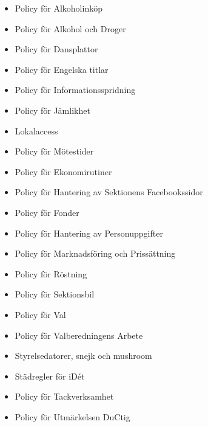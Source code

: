 \documentclass[]{dsekprotokoll}
\begin{document}
\begin{itemize}
    \item Policy för Alkoholinköp
    \item Policy för Alkohol och Droger
    \item Policy för Dansplattor
    \item Policy för Engelska titlar
    \item Policy för Informationsspridning
    \item Policy för Jämlikhet
    \item Lokalaccess
    \item Policy för Mötestider
    \item Policy för Ekonomirutiner
    \item Policy för Hantering av Sektionens Facebookssidor
    \item Policy för Fonder
    \item Policy för Hantering av Personuppgifter
    \item Policy för Marknadsföring och Prissättning
    \item Policy för Röstning
    \item Policy för Sektionsbil
    \item Policy för Val
    \item Policy för Valberedningens Arbete
    \item Styrelsedatorer, snejk och mushroom
    \item Städregler för iDét
    \item Policy för Tackverksamhet
    \item Policy för Utmärkelsen DuCtig
\end{itemize}
\end{document}
